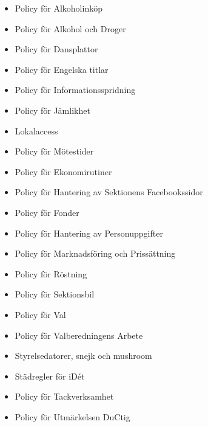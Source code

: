 \documentclass[]{dsekprotokoll}
\begin{document}
\begin{itemize}
    \item Policy för Alkoholinköp
    \item Policy för Alkohol och Droger
    \item Policy för Dansplattor
    \item Policy för Engelska titlar
    \item Policy för Informationsspridning
    \item Policy för Jämlikhet
    \item Lokalaccess
    \item Policy för Mötestider
    \item Policy för Ekonomirutiner
    \item Policy för Hantering av Sektionens Facebookssidor
    \item Policy för Fonder
    \item Policy för Hantering av Personuppgifter
    \item Policy för Marknadsföring och Prissättning
    \item Policy för Röstning
    \item Policy för Sektionsbil
    \item Policy för Val
    \item Policy för Valberedningens Arbete
    \item Styrelsedatorer, snejk och mushroom
    \item Städregler för iDét
    \item Policy för Tackverksamhet
    \item Policy för Utmärkelsen DuCtig
\end{itemize}
\end{document}
